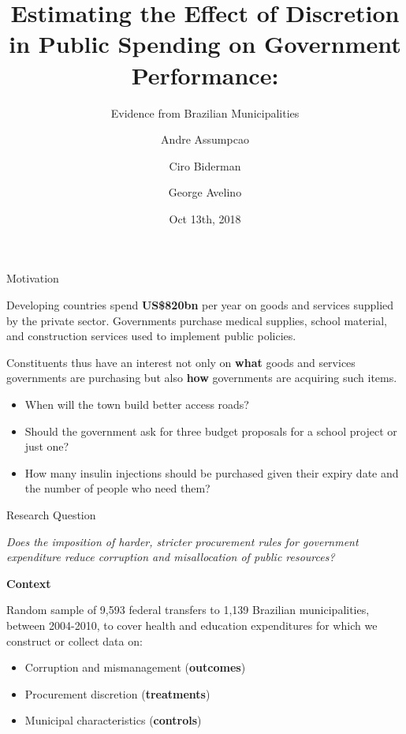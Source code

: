 \documentclass[10pt,ignorenonframetext,]{beamer}
\title{Estimating the Effect of Discretion in Public Spending on Government
Performance:}
\subtitle{Evidence from Brazilian Municipalities}
\author{Andre Assumpcao \and Ciro Biderman \and George Avelino}
\institute{UNC Chapel Hill, FGV-EAESP, FGV-EAESP}
\date{Oct 13th, 2018}
\begin{document}
\frame{\titlepage}

\begin{frame}{Motivation}
\protect\hypertarget{motivation}{}

Developing countries spend \textbf{US\$820bn} per year on goods and
services supplied by the private sector. Governments purchase medical
supplies, school material, and construction services used to implement
public policies.

Constituents thus have an interest not only on \textbf{what} goods and
services governments are purchasing but also \textbf{how} governments
are acquiring such items.

\begin{itemize}
\item
  When will the town build better access roads?
\item
  Should the government ask for three budget proposals for a school
  project or just one?
\item
  How many insulin injections should be purchased given their expiry
  date and the number of people who need them?
\end{itemize}

\end{frame}

\begin{frame}{Research Question}
\protect\hypertarget{research-question}{}

\emph{Does the imposition of harder, stricter procurement rules for
government expenditure reduce corruption and misallocation of public
resources?}

\textbf{Context}

Random sample of 9,593 federal transfers to 1,139 Brazilian
municipalities, between 2004-2010, to cover health and education
expenditures for which we construct or collect data on:

\begin{itemize}
\item
  Corruption and mismanagement (\textbf{outcomes})
\item
  Procurement discretion (\textbf{treatments})
\item
  Municipal characteristics (\textbf{controls})
\end{itemize}

\end{frame}
\end{document}
